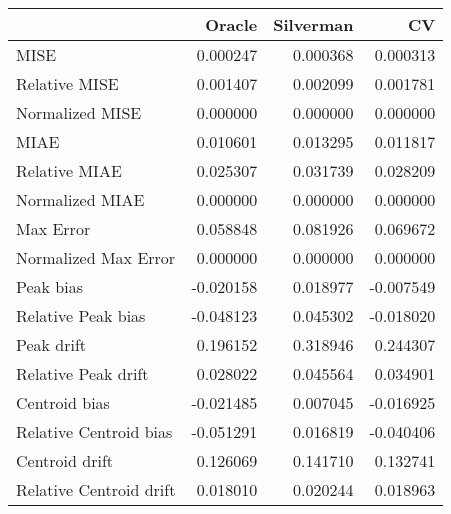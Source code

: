 \begin{tabular}{lrrr}
  \hline
 & Oracle & Silverman & CV \\ 
  \hline
MISE & 0.000247 & 0.000368 & 0.000313 \\ 
  Relative MISE & 0.001407 & 0.002099 & 0.001781 \\ 
  Normalized MISE & 0.000000 & 0.000000 & 0.000000 \\ 
  MIAE & 0.010601 & 0.013295 & 0.011817 \\ 
  Relative MIAE & 0.025307 & 0.031739 & 0.028209 \\ 
  Normalized MIAE & 0.000000 & 0.000000 & 0.000000 \\ 
  Max Error & 0.058848 & 0.081926 & 0.069672 \\ 
  Normalized Max Error & 0.000000 & 0.000000 & 0.000000 \\ 
  Peak bias & -0.020158 & 0.018977 & -0.007549 \\ 
  Relative Peak bias & -0.048123 & 0.045302 & -0.018020 \\ 
  Peak drift & 0.196152 & 0.318946 & 0.244307 \\ 
  Relative Peak drift & 0.028022 & 0.045564 & 0.034901 \\ 
  Centroid bias & -0.021485 & 0.007045 & -0.016925 \\ 
  Relative Centroid bias & -0.051291 & 0.016819 & -0.040406 \\ 
  Centroid drift & 0.126069 & 0.141710 & 0.132741 \\ 
  Relative Centroid drift & 0.018010 & 0.020244 & 0.018963 \\ 
   \hline
\end{tabular}

